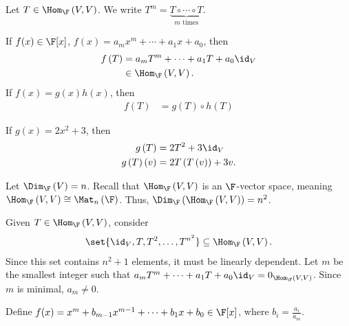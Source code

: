 \documentclass[10pt]{mypackage}
\begin{document}
\begin{notation}
  Let $T\in \Hom_{\F}\left(V,V\right)$. We write $T^m = \underbrace{T\circ \cdots \circ T}_{m\text{ times}}$.\newline

  If $f(x) \in \F[x]$, $f(x) = a_mx^m + \cdots + a_1 x + a_0$, then
  \begin{align*}
    f\left(T\right) &= a_mT^m + \cdots + a_1T + a_0 \id_V\\
                    &\in \Hom_{\F}\left(V,V\right).
  \end{align*}
  If $f(x) = g(x)h(x)$, then
  \begin{align*}
    f(T) &= g(T)\circ h(T)
  \end{align*}
\end{notation}
\begin{example}
  If $g(x) = 2x^2 + 3$, then
  \begin{align*}
    g\left(T\right) &= 2T^2 + 3\id_V\\
    g\left(T\right)\left(v\right) &= 2T\left(T\left(v\right)\right) + 3v.
  \end{align*}
\end{example}
Let $\Dim_{\F}\left(V\right) = n$. Recall that $\Hom_{\F}\left(V,V\right)$ is an $\F$-vector space, meaning $\Hom_{\F}\left(V,V\right) \cong \Mat_{n}\left(\F\right)$. Thus, $\Dim_{\F}\left(\Hom_{\F}\left(V,V\right)\right) = n^2$.\newline

Given $T\in \Hom_{\F}\left(V,V\right)$, consider
\begin{align*}
  \set{\id_V,T,T^2,\dots,T^{n^2}}\subseteq \Hom_{\F}\left(V,V\right).
\end{align*}
Since this set contains $n^2 + 1$ elements, it must be linearly dependent. Let $m$ be the smallest integer such that $a_m T^{m} + \cdots + a_1 T + a_0\id_V = 0_{\Hom_{\F}\left(V,V\right)}$. Since $m$ is minimal, $a_m \neq 0$.\newline

Define $f(x) = x^m + b_{m-1}x^{m-1} + \cdots + b_1 x + b_0\in \F[x]$, where $b_i = \frac{a_i}{a_m}$.\newline
\end{document}
